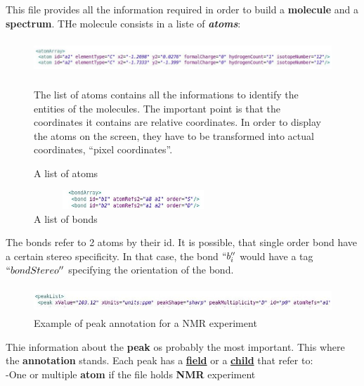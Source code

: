 This file provides all the information required in order to build a \textbf{molecule} and a \textbf{spectrum}.
THe molecule consists in a liste of \textbf{\textit{atoms}}:
    \begin{figure}[h]
    \begin{centering}
    \caption{A list of atoms}
\includegraphics[width=180mm,height=13mm]{./images/atoms}
   \end{centering}
The list of atoms contains all the informations to identify the entities of the molecules. The important point is that the coordinates it contains are relative coordinates. In order to display the atoms on the screen, they have to be transformed into actual coordinates, ``pixel coordinates''.
    \end{figure}
    \begin{figure}[h]
    \begin{centering}
    \caption{A list of bonds}
\includegraphics[width=75mm,height=7mm]{./images/bonds}
    \end{centering}
    \end{figure}
The bonds refer to 2 atoms by their id. It is possible, that single order bond have a certain stereo specificity. In that case, the bond $``b_i''$ would have a tag $``bondStereo''$ specifying the orientation of the bond.
    \begin{figure}[h]
    \begin{centering}
    \caption{Example of peak annotation for a NMR experiment}
\includegraphics[width=150mm,height=10mm]{./images/annotation}
    \end{centering}
    \end{figure}
Thie information about the \textbf{peak} os probably the most important. This where the \textbf{annotation} stands. Each peak has a \textbf{\href{http://www.w3schools.com/schema/el\_field.asp}{field}} or a \textbf{\href{http://www.w3schools.com/dom/dom\_node.asp}{child}} that refer to:\\

-One or multiple \textbf{atom} if the file holds \textbf{NMR} experiment

